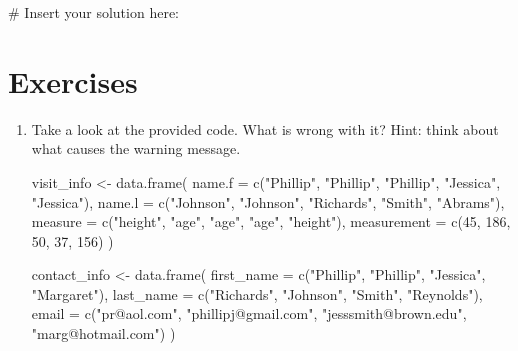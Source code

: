 \documentclass[
  letterpaper,
]{latex/krantz}
\makeatletter
\newenvironment{Shaded}{\begin{snugshade}}{\end{snugshade}}
\newcommand{\AttributeTok}[1]{\textcolor[rgb]{0.40,0.45,0.13}{#1}}
\newcommand{\CommentTok}[1]{\textcolor[rgb]{0.37,0.37,0.37}{#1}}
\newcommand{\DecValTok}[1]{\textcolor[rgb]{0.68,0.00,0.00}{#1}}
\newcommand{\FunctionTok}[1]{\textcolor[rgb]{0.28,0.35,0.67}{#1}}
\newcommand{\NormalTok}[1]{\textcolor[rgb]{0.00,0.23,0.31}{#1}}
\newcommand{\OtherTok}[1]{\textcolor[rgb]{0.00,0.23,0.31}{#1}}
\newcommand{\StringTok}[1]{\textcolor[rgb]{0.13,0.47,0.30}{#1}}
\newenvironment{kframe}{%
\medskip{}
\setlength{\fboxsep}{.8em}
 \def\at@end@of@kframe{}%
 \ifinner\ifhmode%
  \def\at@end@of@kframe{\end{minipage}}%
  \begin{minipage}{\columnwidth}%
 \fi\fi%
 \def\FrameCommand##1{\hskip\@totalleftmargin \hskip-\fboxsep
 \colorbox{shadecolor}{##1}\hskip-\fboxsep
     \hskip-\linewidth \hskip-\@totalleftmargin \hskip\columnwidth}%
 \MakeFramed {\advance\hsize-\width
   \@totalleftmargin\z@ \linewidth\hsize
   \@setminipage}}%
 {\par\unskip\endMakeFramed%
 \at@end@of@kframe}
\renewenvironment{Shaded}{\begin{kframe}}{\end{kframe}}
\makeatother
\begin{document}
\begin{Shaded}
\begin{Highlighting}[]
\CommentTok{\# Insert your solution here:}
\end{Highlighting}
\end{Shaded}

\section{Exercises}\label{exercises-4}

\begin{enumerate}
\def\labelenumi{\arabic{enumi}.}
\item
  Take a look at the provided code. What is wrong with it? Hint: think
  about what causes the warning message.

\begin{Shaded}
\begin{Highlighting}[]
\NormalTok{visit\_info }\OtherTok{\textless{}{-}} \FunctionTok{data.frame}\NormalTok{(}
  \AttributeTok{name.f =} \FunctionTok{c}\NormalTok{(}\StringTok{"Phillip"}\NormalTok{, }\StringTok{"Phillip"}\NormalTok{, }\StringTok{"Phillip"}\NormalTok{, }\StringTok{"Jessica"}\NormalTok{, }
             \StringTok{"Jessica"}\NormalTok{),}
  \AttributeTok{name.l =} \FunctionTok{c}\NormalTok{(}\StringTok{"Johnson"}\NormalTok{, }\StringTok{"Johnson"}\NormalTok{, }\StringTok{"Richards"}\NormalTok{, }\StringTok{"Smith"}\NormalTok{, }
             \StringTok{"Abrams"}\NormalTok{),}
  \AttributeTok{measure =} \FunctionTok{c}\NormalTok{(}\StringTok{"height"}\NormalTok{, }\StringTok{"age"}\NormalTok{, }\StringTok{"age"}\NormalTok{, }\StringTok{"age"}\NormalTok{, }\StringTok{"height"}\NormalTok{),}
  \AttributeTok{measurement =} \FunctionTok{c}\NormalTok{(}\DecValTok{45}\NormalTok{, }\DecValTok{186}\NormalTok{, }\DecValTok{50}\NormalTok{, }\DecValTok{37}\NormalTok{, }\DecValTok{156}\NormalTok{)}
\NormalTok{)}

\NormalTok{contact\_info }\OtherTok{\textless{}{-}} \FunctionTok{data.frame}\NormalTok{(}
\AttributeTok{first\_name =} \FunctionTok{c}\NormalTok{(}\StringTok{"Phillip"}\NormalTok{, }\StringTok{"Phillip"}\NormalTok{, }\StringTok{"Jessica"}\NormalTok{, }\StringTok{"Margaret"}\NormalTok{),}
\AttributeTok{last\_name =} \FunctionTok{c}\NormalTok{(}\StringTok{"Richards"}\NormalTok{, }\StringTok{"Johnson"}\NormalTok{, }\StringTok{"Smith"}\NormalTok{, }\StringTok{"Reynolds"}\NormalTok{),}
\AttributeTok{email =} \FunctionTok{c}\NormalTok{(}\StringTok{"pr@aol.com"}\NormalTok{, }\StringTok{"phillipj@gmail.com"}\NormalTok{, }
          \StringTok{"jesssmith@brown.edu"}\NormalTok{, }\StringTok{"marg@hotmail.com"}\NormalTok{)}
\NormalTok{)}


\end{Highlighting}
\end{Shaded}
\end{enumerate}
\end{document}
